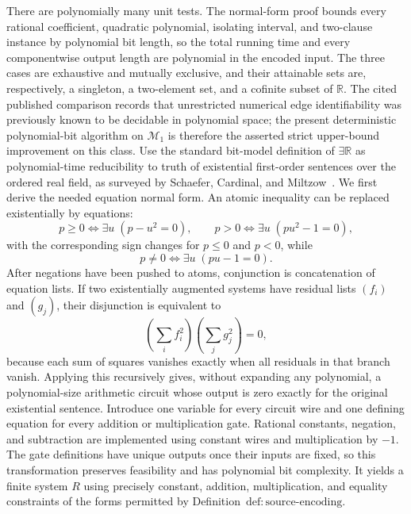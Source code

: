 There are polynomially many unit tests.  The normal-form proof bounds every rational coefficient, quadratic polynomial, isolating interval, and two-clause instance by polynomial bit length, so the total running time and every componentwise output length are polynomial in the encoded input.  The three cases are exhaustive and mutually exclusive, and their attainable sets are, respectively, a singleton, a two-element set, and a cofinite subset of \(\mathbb R\).  The cited published comparison records that unrestricted numerical edge identifiability was previously known to be decidable in polynomial space; the present deterministic polynomial-bit algorithm on \(\mathcal M_1\) is therefore the asserted strict upper-bound improvement on this class.
Use the standard bit-model definition of \(\exists\mathbb R\) as polynomial-time reducibility to truth of existential first-order sentences over the ordered real field, as surveyed by Schaefer, Cardinal, and Miltzow~\cite{SchaeferCardinalMiltzow2024}.  We first derive the needed equation normal form.  An atomic inequality can be replaced existentially by equations:
\[
p\ge0\Longleftrightarrow \exists u\;(p-u^2=0),\qquad
p>0\Longleftrightarrow \exists u\;(pu^2-1=0),
\]
with the corresponding sign changes for \(p\le0\) and \(p<0\), while
\[
p\ne0\Longleftrightarrow \exists u\;(pu-1=0).
\]
After negations have been pushed to atoms, conjunction is concatenation of equation lists.  If two existentially augmented systems have residual lists \((f_i)\) and \((g_j)\), their disjunction is equivalent to
\[
\left(\sum_i f_i^2\right)\left(\sum_j g_j^2\right)=0,
\]
because each sum of squares vanishes exactly when all residuals in that branch vanish.  Applying this recursively gives, without expanding any polynomial, a polynomial-size arithmetic circuit whose output is zero exactly for the original existential sentence.  Introduce one variable for every circuit wire and one defining equation for every addition or multiplication gate.  Rational constants, negation, and subtraction are implemented using constant wires and multiplication by \(-1\).  The gate definitions have unique outputs once their inputs are fixed, so this transformation preserves feasibility and has polynomial bit complexity.  It yields a finite system \(R\) using precisely constant, addition, multiplication, and equality constraints of the forms permitted by Definition~\(\mathrm{def:source\mbox{-}encoding}\).

